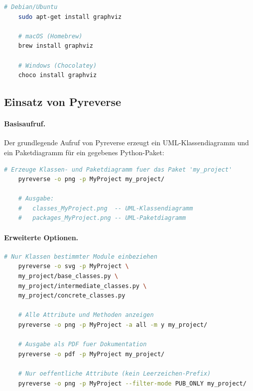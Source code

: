 ﻿\documentclass[a4paper,12pt]{article}
\begin{document}
\begin{lstlisting}[language=bash, caption={Installation von Graphviz},
	label={lst:graphviz}]
	# Debian/Ubuntu
	sudo apt-get install graphviz
	
	# macOS (Homebrew)
	brew install graphviz
	
	# Windows (Chocolatey)
	choco install graphviz
\end{lstlisting}

\subsection{Einsatz von Pyreverse}

\paragraph{Basisaufruf.}
Der grundlegende Aufruf von Pyreverse erzeugt ein UML-Klassendiagramm und ein
Paketdiagramm für ein gegebenes Python-Paket:

\begin{lstlisting}[language=bash, caption={Grundlegender Pyreverse-Aufruf},
	label={lst:pyreverse_basic}]
	# Erzeuge Klassen- und Paketdiagramm fuer das Paket 'my_project'
	pyreverse -o png -p MyProject my_project/
	
	# Ausgabe:
	#   classes_MyProject.png  -- UML-Klassendiagramm
	#   packages_MyProject.png -- UML-Paketdiagramm
\end{lstlisting}

\paragraph{Erweiterte Optionen.}

\begin{lstlisting}[language=bash, caption={Erweiterte Pyreverse-Optionen},
	label={lst:pyreverse_advanced}]
	# Nur Klassen bestimmter Module einbeziehen
	pyreverse -o svg -p MyProject \
	my_project/base_classes.py \
	my_project/intermediate_classes.py \
	my_project/concrete_classes.py
	
	# Alle Attribute und Methoden anzeigen
	pyreverse -o png -p MyProject -a all -m y my_project/
	
	# Ausgabe als PDF fuer Dokumentation
	pyreverse -o pdf -p MyProject my_project/
	
	# Nur oeffentliche Attribute (kein Leerzeichen-Prefix)
	pyreverse -o png -p MyProject --filter-mode PUB_ONLY my_project/
\end{lstlisting}
\end{document}
